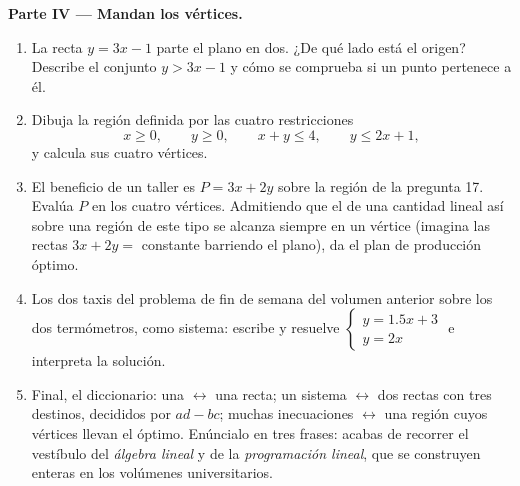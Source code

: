 \begin{problem}
\medskip
\noindent\textbf{Parte IV --- Mandan los vértices.}
\begin{enumerate}[resume]
  \item La recta $y = 3x - 1$ parte el plano en dos. ¿De qué lado está el
        origen? Describe el conjunto $y > 3x - 1$ y cómo se comprueba si
        un punto pertenece a él.
  \item Dibuja la región definida por las cuatro restricciones
        \[
        x \geq 0, \qquad y \geq 0, \qquad x + y \leq 4,
        \qquad y \leq 2x + 1,
        \]
        y calcula sus cuatro vértices.
  \item El beneficio de un taller es $P = 3x + 2y$ sobre la región de la
        pregunta 17. Evalúa $P$ en los cuatro vértices. Admitiendo que el
         de una cantidad lineal así sobre una región de este tipo se
        alcanza siempre en un vértice (imagina las rectas
        $3x + 2y = $ constante barriendo el plano), da el plan de
        producción óptimo.
  \item Los dos taxis del problema de fin de semana del volumen anterior
        sobre los dos termómetros, como sistema: escribe y resuelve
        $\begin{cases} y = 1.5x + 3 \\ y = 2x \end{cases}$ e interpreta la
        solución.
  \item Final, el diccionario: una  $\leftrightarrow$ una recta;
        un sistema $\leftrightarrow$ dos rectas con tres destinos,
        decididos por $ad - bc$; muchas inecuaciones $\leftrightarrow$ una
        región cuyos vértices llevan el óptimo. Enúncialo en tres frases:
        acabas de recorrer el vestíbulo del \emph{álgebra lineal} y de la
        \emph{programación lineal}, que se construyen enteras en los
        volúmenes universitarios.
\end{enumerate}
\end{problem}
